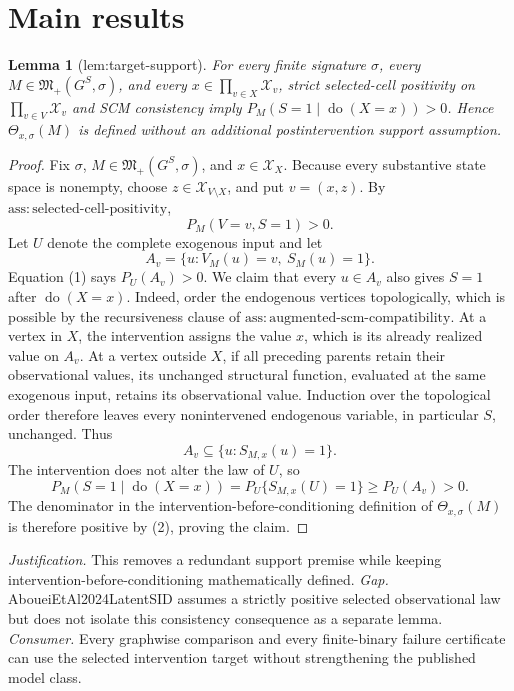 \documentclass{article}
\newtheorem{lemma}{Lemma}
\begin{document}
\section{Main results}

\begin{lemma}[lem:target-support]\label{lem:target-support}
For every finite signature \(\sigma\), every \(M\in\mathfrak M_+(G^S,\sigma)\), and every \(x\in\prod_{v\in X}\mathcal X_v\), strict selected-cell positivity on \(\prod_{v\in V}\mathcal X_v\) and SCM consistency imply \(P_M(S=1\mid\operatorname{do}(X=x))>0\). Hence \(\Theta_{x,\sigma}(M)\) is defined without an additional postintervention support assumption.
\end{lemma}
\begin{proof}
Fix \(\sigma\), \(M\in\mathfrak M_+(G^S,\sigma)\), and \(x\in\mathcal X_X\).  Because every substantive state space is nonempty, choose \(z\in\mathcal X_{V\setminus X}\), and put \(v=(x,z)\).  By \(\mathrm{ass:selected\text{-}cell\text{-}positivity}\),
\[
  P_M(V=v,S=1)>0. \tag{1}
\]
Let \(U\) denote the complete exogenous input and let
\[
  A_v=\{u:V_M(u)=v,\ S_M(u)=1\}.
\]
Equation (1) says \(P_U(A_v)>0\).  We claim that every \(u\in A_v\) also gives \(S=1\) after \(\operatorname{do}(X=x)\).  Indeed, order the endogenous vertices topologically, which is possible by the recursiveness clause of \(\mathrm{ass:augmented\text{-}scm\text{-}compatibility}\).  At a vertex in \(X\), the intervention assigns the value \(x\), which is its already realized value on \(A_v\).  At a vertex outside \(X\), if all preceding parents retain their observational values, its unchanged structural function, evaluated at the same exogenous input, retains its observational value.  Induction over the topological order therefore leaves every nonintervened endogenous variable, in particular \(S\), unchanged.  Thus
\[
  A_v\subseteq\{u:S_{M,x}(u)=1\}.
\]
The intervention does not alter the law of \(U\), so
\[
  P_M(S=1\mid\operatorname{do}(X=x))
  =P_U\{S_{M,x}(U)=1\}
  \ge P_U(A_v)>0. \tag{2}
\]
The denominator in the intervention-before-conditioning definition of \(\Theta_{x,\sigma}(M)\) is therefore positive by (2), proving the claim.
\end{proof}
\par\smallskip\noindent \textit{Justification.} This removes a redundant support premise while keeping intervention-before-conditioning mathematically defined. \textit{Gap.} AboueiEtAl2024LatentSID assumes a strictly positive selected observational law but does not isolate this consistency consequence as a separate lemma. \textit{Consumer.} Every graphwise comparison and every finite-binary failure certificate can use the selected intervention target without strengthening the published model class.
\end{document}
